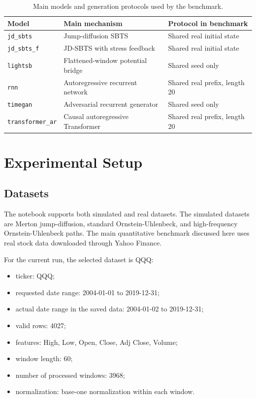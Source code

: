 \documentclass[11pt,a4paper]{article}
\begin{document}
\begin{table}[H]
\centering
\caption{Main models and generation protocols used by the benchmark.}
\begin{tabular}{lll}
\toprule
Model & Main mechanism & Protocol in benchmark \\
\midrule
\texttt{jd\_sbts} & Jump-diffusion SBTS & Shared real initial state \\
\texttt{jd\_sbts\_f} & JD-SBTS with stress feedback & Shared real initial state \\
\texttt{lightsb} & Flattened-window potential bridge & Shared seed only \\
\texttt{rnn} & Autoregressive recurrent network & Shared real prefix, length 20 \\
\texttt{timegan} & Adversarial recurrent generator & Shared seed only \\
\texttt{transformer\_ar} & Causal autoregressive Transformer & Shared real prefix, length 20 \\
\bottomrule
\end{tabular}
\end{table}

\section{Experimental Setup}

\subsection{Datasets}

The notebook supports both simulated and real datasets. The simulated datasets
are Merton jump-diffusion, standard Ornstein-Uhlenbeck, and high-frequency
Ornstein-Uhlenbeck paths. The main quantitative benchmark discussed here uses
real stock data downloaded through Yahoo Finance.

For the current run, the selected dataset is QQQ:
\begin{itemize}
    \item ticker: QQQ;
    \item requested date range: 2004-01-01 to 2019-12-31;
    \item actual date range in the saved data: 2004-01-02 to 2019-12-31;
    \item valid rows: 4027;
    \item features: High, Low, Open, Close, Adj Close, Volume;
    \item window length: 60;
    \item number of processed windows: 3968;
    \item normalization: base-one normalization within each window.
\end{itemize}
\end{document}

